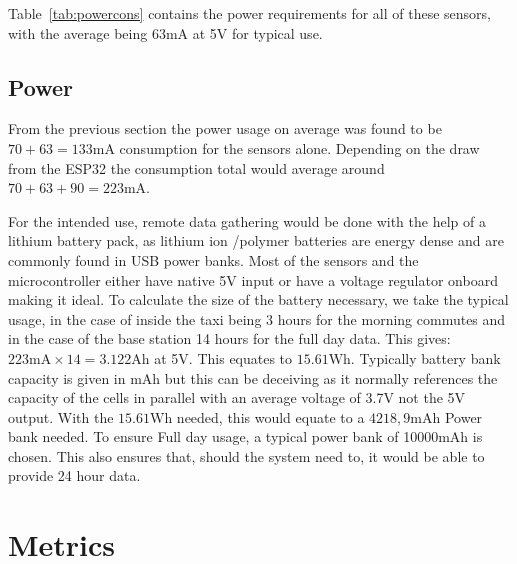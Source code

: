 \noindent Table~\ref{tab:powercons} \cite{sen55} contains the power requirements for all of these sensors, with the average being 63mA at 5V for typical use.

\subsection{Power}
From the previous section the power usage on average was found to be $ 70 +  63 = 133\si{\milli\ampere}$ consumption for the sensors alone. Depending on the draw from the ESP32 the consumption total would average around $ 70 +  63 + 90 = 223\si{\milli\ampere}$\cite{wifiespnow}. 

\noindent
For the intended use, remote data gathering would be done with the help of a lithium battery pack, as lithium ion /polymer batteries are energy dense and are commonly found in USB power banks. Most of the sensors and the microcontroller either have native 5V input or have a voltage regulator onboard making it ideal. To calculate the size of the battery necessary, we take the typical usage, in the case of inside the taxi being 3 hours for the morning commutes and in the case of the base station 14 hours for the full day data. This gives: $223\si{\milli\ampere} \times 14 = 3.122 \si{\ampere\hour} $ at 5V. This equates to $15.61 \si{\watt\hour}$. Typically battery bank capacity is given in $ \si{\milli\ampere\hour} $ but this can be deceiving as it normally references the capacity of the cells in parallel with an average voltage of 3.7V not the 5V output. With the $15.61 \si{\watt\hour}$ needed, this would equate to a  $ 4218,9\si{\milli\ampere\hour} $ Power bank needed. To ensure Full day usage, a typical power bank of 10000$ \si{\milli\ampere\hour} $ is chosen. This also ensures that, should the system need to, it would be able to provide 24 hour data.


\section{Metrics}
